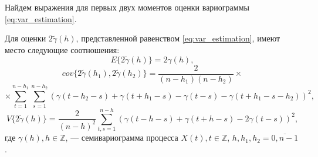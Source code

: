 Найдем выражения для первых двух моментов оценки вариограммы \eqref{eq:var_estimation}.
\begin{Theorem}
	Для оценки $ 2 \tilde{\gamma}(h) $, представленной равенством \eqref{eq:var_estimation}, имеют место следующие соотношения:
	\begin{equation}
	\label{eq:est_ex}
		E \{2 \tilde{\gamma}(h) \} = 2 \gamma(h), %
	\end{equation}
	\begin{equation*}
		cov \{ 2 \tilde{\gamma}(h_1), 2 \tilde{\gamma}(h_2) \} = \frac{2}{(n - h_1)(n - h_2)} \times
	\end{equation*}
	\begin{equation}
	\label{eq:est_cov}
		 \times \sum_{t = 1}^{n - h_1}\sum_{s = 1}^{n - h_2} (\gamma(t - h_2 - s) + \gamma(t + h_1 - s) - \gamma(t - s) - \gamma(t + h_1 - s - h_2))^2,
	\end{equation}
	\begin{equation}
	\label{eq:est_var}
		V \{ 2 \tilde{\gamma}(h) \} = \frac{2}{(n-h)^2}\sum_{t,s = 1}^{n - h} ( \gamma(t - h - s) + \gamma(t + h - s) - 2\gamma(t - s) )^2,
	\end{equation}
	где $ \gamma(h), h \in \mathbb{Z} $, --- семивариограмма процесса $ X(t), t \in \mathbb{Z}$, $ h, h_1, h_2 = \overline{0, n - 1} $.
\end{Theorem}
